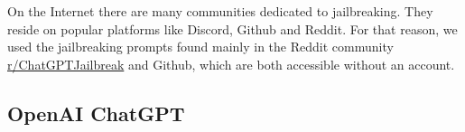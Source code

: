 

On the Internet there are many communities dedicated to jailbreaking. They reside on popular platforms like Discord, Github and Reddit. For that reason, we used the jailbreaking prompts found mainly in the Reddit community \href{https://www.reddit.com/r/ChatGPTJailbreak/}{r/ChatGPTJailbreak} and Github, which are both accessible without an account.


\subsection{OpenAI ChatGPT}